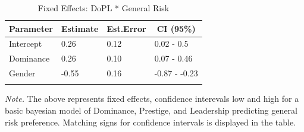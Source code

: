 \documentclass[
  donotrepeattitle,doc, 12pt, a4paper,floatsintext]{apa7}
\begin{document}
\begin{table}[ht]

\begin{center}
\begin{threeparttable}

\caption{\label{tab:m1-fixef-Experiment-1}Fixed Effects: DoPL * General Risk}

\small{

\begin{tabular}{llll}
\toprule
Parameter & \multicolumn{1}{c}{Estimate} & \multicolumn{1}{c}{Est.Error} & \multicolumn{1}{c}{CI (95\%)}\\
\midrule
Intercept & 0.26 & 0.12 & 0.02 - 0.5\\
Dominance & 0.26 & 0.10 & 0.07 - 0.46\\
Gender & -0.55 & 0.16 & -0.87 - -0.23\\
\bottomrule
\addlinespace
\end{tabular}

}

\begin{tablenotes}[para]
\normalsize{\textit{Note.} The above represents fixed effects, confidence interevals low and high for a basic bayesian model of Dominance, Prestige, and Leadership predicting general risk preference. Matching signs for confidence intervals is displayed in the table.}
\end{tablenotes}

\end{threeparttable}
\end{center}

\end{table}
\end{document}
